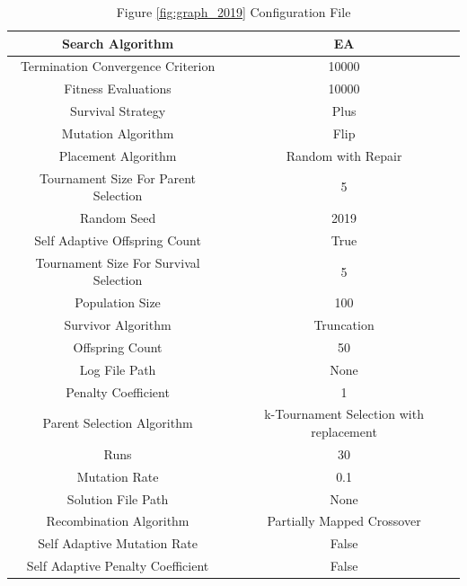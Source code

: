 \documentclass{standalone}
\begin{document}
\begin{table}[!htb]
	\centering
	\caption{Figure \ref{fig:graph_2019} Configuration File}
	\label{tab:graph_2019}
	\begin{tabular}{| c | c |}
		\hline
		Search Algorithm		& EA		 \\
		\hline
		Termination Convergence Criterion		& 10000		 \\
		\hline
		Fitness Evaluations		& 10000		 \\
		\hline
		Survival Strategy		& Plus		 \\
		\hline
		Mutation Algorithm		& Flip		 \\
		\hline
		Placement Algorithm		& Random with Repair		 \\
		\hline
		Tournament Size For Parent Selection		& 5		 \\
		\hline
		Random Seed		& 2019		 \\
		\hline
		Self Adaptive Offspring Count		& True		 \\
		\hline
		Tournament Size For Survival Selection		& 5		 \\
		\hline
		Population Size		& 100		 \\
		\hline
		Survivor Algorithm		& Truncation		 \\
		\hline
		Offspring Count		& 50		 \\
		\hline
		Log File Path		& None		 \\
		\hline
		Penalty Coefficient		& 1		 \\
		\hline
		Parent Selection Algorithm		& k-Tournament Selection with replacement		 \\
		\hline
		Runs		& 30		 \\
		\hline
		Mutation Rate		& 0.1		 \\
		\hline
		Solution File Path		& None		 \\
		\hline
		Recombination Algorithm		& Partially Mapped Crossover		 \\
		\hline
		Self Adaptive Mutation Rate		& False		 \\
		\hline
		Self Adaptive Penalty Coefficient		& False		 \\
		\hline
	\end{tabular}
\end{table}
\end{document}
